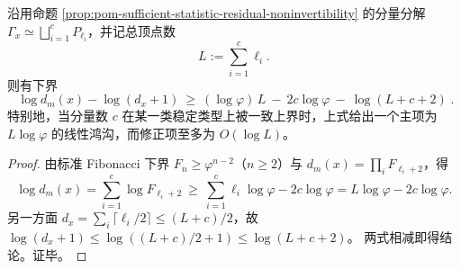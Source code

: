\begin{corollary}[充分统计外置与可逆外置之间的线性熵鸿沟]\label{cor:pom-sufficient-vs-invertible-externalization-entropy-gap}
沿用命题 \ref{prop:pom-sufficient-statistic-residual-noninvertibility} 的分量分解 \(\Gamma_x\simeq\bigsqcup_{i=1}^c P_{\ell_i}\)，并记总顶点数
\[
L:=\sum_{i=1}^{c}\ell_i.
\]
则有下界
\[
\boxed{\;
\log d_m(x)-\log(d_x+1)
\ \ge\
(\log\varphi)\,L\ -\ 2c\log\varphi\ -\ \log(L+c+2)\; }.
\]
特别地，当分量数 \(c\) 在某一类稳定类型上被一致上界时，上式给出一个主项为 \(L\log\varphi\) 的线性鸿沟，而修正项至多为 \(O(\log L)\)。
\end{corollary}
\begin{proof}
由标准 Fibonacci 下界 \(F_n\ge \varphi^{n-2}\)（\(n\ge 2\)）与 \(d_m(x)=\prod_i F_{\ell_i+2}\)，得
\[
\log d_m(x)=\sum_{i=1}^{c}\log F_{\ell_i+2}
\ \ge\ \sum_{i=1}^{c}\ell_i\log\varphi-2c\log\varphi
=L\log\varphi-2c\log\varphi.
\]
另一方面 \(d_x=\sum_i\lceil \ell_i/2\rceil\le (L+c)/2\)，故
\(
\log(d_x+1)\le \log((L+c)/2+1)\le \log(L+c+2)
\)。
两式相减即得结论。证毕。
\end{proof}

\endinput

